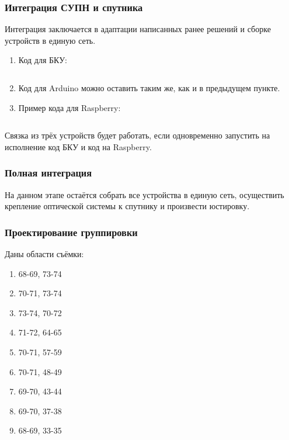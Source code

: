 \solutionSection

\subsubsection*{Интеграция СУПН и спутника}

Интеграция заключается в адаптации написанных ранее решений и сборке устройств в единую сеть.

\begin{enumerate}
    \item Код для БКУ:
    
    \inputminted[fontsize=\footnotesize, linenos]{python}{final/command_tour/dzz/task_03/source_1.py}

    \item Код для Arduino можно оставить таким же, как и в предыдущем пункте.
    \item Пример кода для Raspberry:
    
    \inputminted[fontsize=\footnotesize, linenos]{python}{final/command_tour/dzz/task_03/source_2.py}
\end{enumerate}

Связка из трёх устройств будет работать, если одновременно запустить на исполнение код БКУ и код на Raspberry.

\subsubsection*{Полная интеграция}

На данном этапе остаётся собрать все устройства в единую сеть, осуществить крепление оптической системы к спутнику и произвести юстировку. 

\subsubsection*{Проектирование группировки}

Даны области съёмки:
\begin{enumerate}
    \item 68-69, 73-74
    \item 70-71, 73-74
    \item 73-74, 70-72
    \item 71-72, 64-65
    \item 70-71, 57-59
    \item 70-71, 48-49
    \item 69-70, 43-44
    \item 69-70, 37-38
    \item 68-69, 33-35
\end{enumerate}

